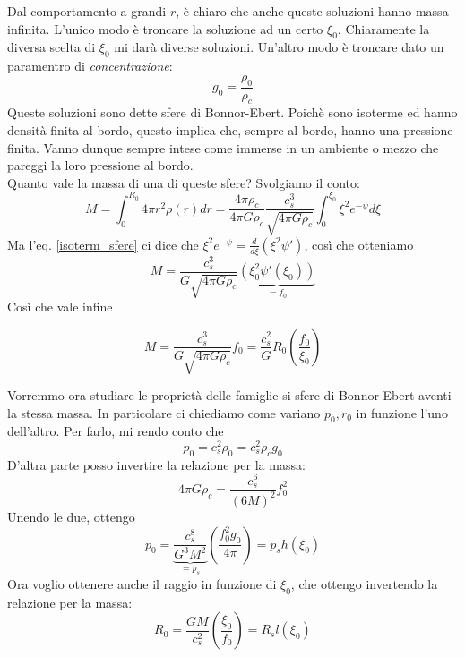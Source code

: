 \documentclass{report}
\begin{document}
    Dal comportamento a grandi $r$, è chiaro che anche queste soluzioni hanno massa infinita. L'unico modo è troncare la soluzione ad un certo $\xi_0$. Chiaramente la diversa scelta di $\xi_0$ mi darà diverse soluzioni. Un'altro modo è troncare dato un paramentro di \emph{concentrazione}: 
    \begin{equation}
        g_0 = \frac{\rho_0}{\rho_c}
    \end{equation}
    Queste soluzioni sono dette sfere di Bonnor-Ebert. Poichè sono isoterme ed hanno densità finita al bordo, questo implica che, sempre al bordo, hanno una pressione finita. Vanno dunque sempre intese come immerse in un ambiente o mezzo che pareggi la loro pressione al bordo. \\

    Quanto vale la massa di una di queste sfere? Svolgiamo il conto: 
    \begin{equation}
        M = \int_0^{R_0}4\pi r^2 \rho(r)dr = \frac{4\pi \rho_c}{4\pi G \rho_c} \frac{c_s^3}{\sqrt{4\pi G\rho_c}}\int_0^{\xi_0}\xi^2 e^{-\psi}d\xi
    \end{equation}
    Ma l'eq. \ref{isoterm_sfere} ci dice che $\xi^2e^{-\psi} = \frac{d}{d\xi}\left(\xi^2 \psi'\right) $, così che otteniamo
    \begin{equation}
        M = \frac{c_s^3}{G\sqrt{4\pi G\rho_c}}\underbrace{(\xi_0^2 \psi'(\xi_0))}_{= f_0}
    \end{equation}
    Così che vale infine 
    \begin{tcolorbox}[colback=myg!15, colframe=black, boxrule=1pt]
    \begin{equation}
        M = \frac{c_s^3}{G\sqrt{4\pi G\rho_c}} f_0 = \frac{c_s^2}{G}R_0 \left(\frac{f_0}{\xi_0} \right)
    \end{equation}
    \end{tcolorbox}

    Vorremmo ora studiare le proprietà delle famiglie si sfere di Bonnor-Ebert aventi la stessa massa. In particolare ci chiediamo come variano $p_0, r_0$ in funzione l'uno dell'altro. 
    Per farlo, mi rendo conto che 
    \begin{equation}
        p_0 = c_s^2\rho_0 = c_s^2\rho_cg_0
    \end{equation}
    D'altra parte posso invertire la relazione per la massa:
    \begin{equation}
        4\pi G \rho_c = \frac{c_s^6}{(6M)^2}f_0 ^2
    \end{equation}
    Unendo le due, ottengo 
    \begin{equation}
        p_0 = \underbrace{\frac{c_s^8}{G^3M^2}}_{=p_s}\left(\frac{f_0^2g_0}{4\pi} \right) = p_s h(\xi_0)
    \end{equation}
    Ora voglio ottenere anche il raggio in funzione di $\xi_0$, che ottengo invertendo la relazione per la massa: 
    \begin{equation}
        R_0 = \frac{GM}{c_s^2}\left(\frac{\xi_0}{f_0} \right) = R_sl(\xi_0)
    \end{equation}
\end{document}

